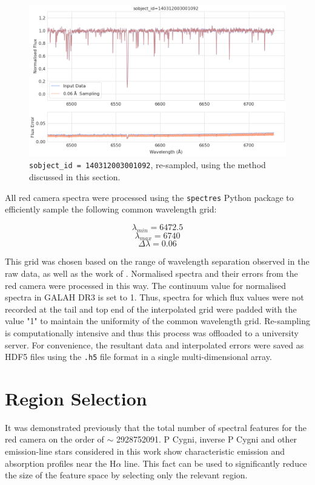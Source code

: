 \begin{figure}[!htb]
\centering
\includegraphics[scale=.45]{figures/resampling example.png}
\caption{\texttt{sobject\_id = 140312003001092}, re-sampled, using the method discussed in this section.}
\end{figure}

All red camera spectra were processed using the \texttt{spectres} Python package \citep{carnall2017spectres} to efficiently sample  the following common wavelength grid:

\[\lambda_{min} = 6472.5\]
\[\lambda_{max} = 6740\]
\[\Delta\lambda = 0.06\]

This grid was chosen based on the range of wavelength separation observed in the raw data, as well as the work of \citet{vcotar2021galah}. Normalised spectra and their errors from the red camera were processed in this way. The continuum value for normalised spectra in GALAH DR3 is set to 1. Thus, spectra for which flux values were not recorded at the tail and top end of the interpolated grid were padded with the value "1" to maintain the uniformity of the common wavelength grid. Re-sampling is computationally intensive and thus this process was offloaded to a university server. For convenience, the resultant data and interpolated errors were saved as HDF5 files using the \texttt{.h5} file format in a single multi-dimensional array. 

\section{Region Selection}

It was demonstrated previously that the total number of spectral features for the red camera on the order of $\sim$ \num[round-precision=2,round-mode=figures, scientific-notation=true]{2928752091}. P Cygni, inverse P Cygni and other emission-line stars considered in this work show characteristic emission and absorption profiles near the H$\alpha$ line. This fact can be used to significantly reduce the size of the feature space by selecting only the relevant region.

